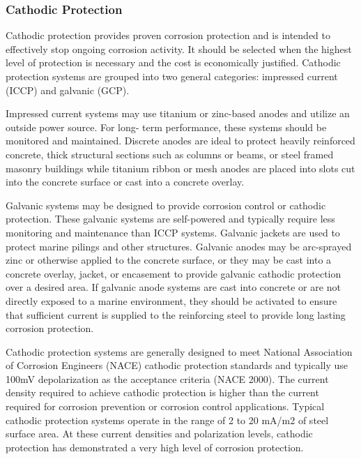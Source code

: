 \subsubsection{Cathodic Protection}
Cathodic protection provides proven corrosion protection and is intended to effectively stop ongoing corrosion activity. It should be selected when the highest level of protection is necessary and the cost is economically justified.  Cathodic protection systems are grouped into two general categories: impressed current (ICCP) and galvanic (GCP).

Impressed current systems may use titanium or zinc-based anodes and utilize an outside power source. For long- term performance, these systems should be monitored and maintained. Discrete anodes are ideal to protect heavily reinforced concrete, thick structural sections such as columns or beams, or steel framed masonry buildings while titanium ribbon or mesh anodes are placed into slots cut into the concrete surface or cast into a concrete overlay.

Galvanic systems may be designed to provide corrosion control or cathodic protection. These galvanic systems are self-powered and typically require less monitoring and maintenance than ICCP systems. Galvanic jackets are used to protect marine pilings and other structures. Galvanic anodes may be arc-sprayed zinc or otherwise applied to the concrete surface, or they may be cast into a concrete overlay, jacket, or encasement to provide galvanic cathodic protection over a desired area. If galvanic anode systems are cast into concrete or are not directly exposed to a marine environment, they should be activated to ensure that sufficient current is supplied to the reinforcing steel to
provide long lasting corrosion protection.

Cathodic protection systems are generally designed to meet National Association of Corrosion Engineers (NACE) cathodic protection standards and typically use 100mV depolarization as the acceptance criteria (NACE 2000). The current density required to achieve cathodic protection is higher than the current required for corrosion prevention or corrosion control applications. Typical cathodic protection systems operate in the range of 2 to 20 mA/m2 of steel surface area. At these current densities and polarization levels, cathodic protection has demonstrated a very high level of corrosion protection.


